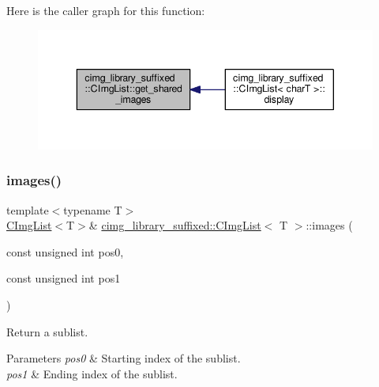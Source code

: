 Here is the caller graph for this function\+:
\nopagebreak
\begin{figure}[H]
\begin{center}
\leavevmode
\includegraphics[width=343pt]{d5/d7e/structcimg__library__suffixed_1_1CImgList_a1a54d7eef89663fdcc5ffb61ed9a48b5_icgraph}
\end{center}
\end{figure}
\mbox{\label{structcimg__library__suffixed_1_1CImgList_a1a45c7e6d307a716e71f0070ced8b195}} 
\subsubsection{\texorpdfstring{images()}{images()}}
{\footnotesize\ttfamily template$<$typename T$>$ \\
\hyperlink{structcimg__library__suffixed_1_1CImgList}{C\+Img\+List}$<$T$>$\& \hyperlink{structcimg__library__suffixed_1_1CImgList}{cimg\+\_\+library\+\_\+suffixed\+::\+C\+Img\+List}$<$ T $>$\+::images (\begin{DoxyParamCaption}\item[{const unsigned int}]{pos0,  }\item[{const unsigned int}]{pos1 }\end{DoxyParamCaption})\hspace{0.3cm}{\ttfamily [inline]}}



Return a sublist. 


\begin{DoxyParams}{Parameters}
{\em pos0} & Starting index of the sublist. \\
\hline
{\em pos1} & Ending index of the sublist. \\
\hline
\end{DoxyParams}


